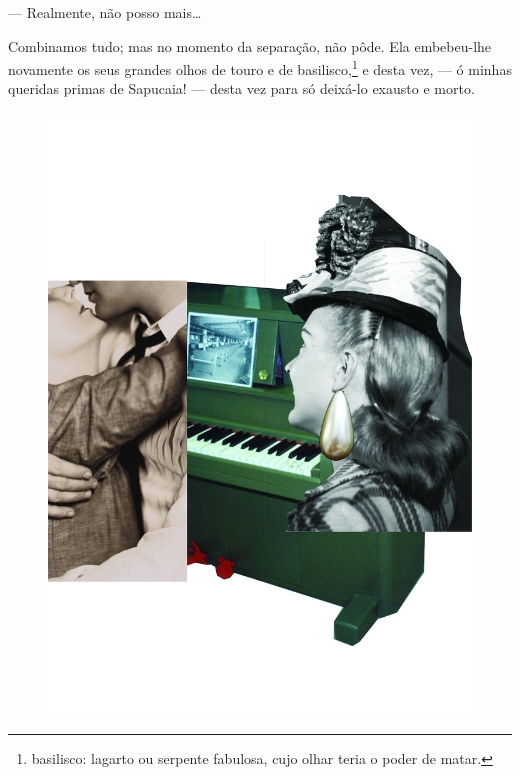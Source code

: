 --- Realmente, não posso mais\ldots{}

Combinamos tudo; mas no momento da separação, não pôde. Ela embebeu-lhe
novamente os seus grandes olhos de touro e de basilisco,\footnote{basilisco:
  lagarto ou serpente fabulosa, cujo olhar teria o poder de matar.} e
desta vez, --- ó minhas queridas primas de Sapucaia! --- desta vez para
só deixá-lo exausto e morto.

\pagebreak
\thispagestyle{empty}
\begin{figure}
\includegraphics[width=\textwidth]{./ilustracoes/11_BRINCOS.jpg}
\end{figure}
\pagebreak


